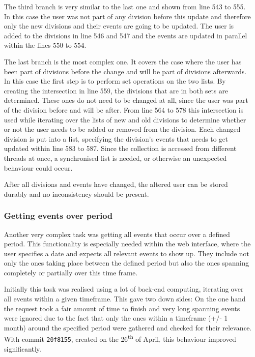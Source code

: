 The third branch is very similar to the last one and shown from line 543 to 555. In this case the user was not part of any division before this update and therefore only the new divisions and their events are going to be updated. The user is added to the divisions in line 546 and 547 and the events are updated in parallel within the lines 550 to 554. 

The last branch is the most complex one. It covers the case where the user has been part of divisions before the change and will be part of divisions afterwards. In this case the first step is to perform set operations on the two lists. By creating the intersection in line 559, the divisions that are in both sets are determined. These ones do not need to be changed at all, since the user was part of the division before and will be after. From line 564 to 578 this intersection is used while iterating over the lists of new and old divisions to determine whether or not the user needs to be added or removed from the division. Each changed division is put into a list, specifying the division's events that needs to get updated within line 583 to 587. Since the collection is accessed from different threads at once, a synchronised list is needed, or otherwise an unexpected behaviour could occur.

After all divisions and events have changed, the altered user can be stored durably and no inconsistency should be present.

\subsubsection{Getting events over period}

Another very complex task was getting all events that occur over a defined period. This functionality is especially needed within the web interface, where the user specifies a date and expects all relevant events to show up. They include not only the ones taking place between the defined period but also the ones spanning completely or partially over this time frame.

Initially this task was realised using a lot of back-end computing, iterating over all events within a given timeframe. This gave two down sides: On the one hand the request took a fair amount of time to finish and very long spanning events were ignored due to the fact that only the ones within a timeframe (+/- 1 month) around the specified period were gathered and checked for their relevance. With commit \texttt{20f8155}, created on the 26\textsuperscript{th} of April, this behaviour improved significantly.

